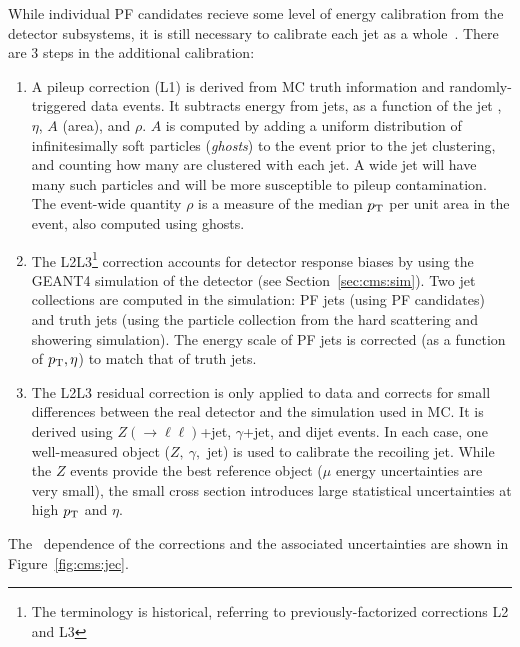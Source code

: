 While individual PF candidates recieve some level of energy calibration from the detector subsystems, it is still necessary to calibrate each jet as a whole~\cite{jec}.
There are 3 steps in the additional calibration:
\begin{enumerate}
\item A pileup correction (L1) is derived from MC truth information and randomly-triggered data events.
It subtracts energy from jets, as a function of the jet \pt, $\eta$, $A$ (area), and $\rho$. 
$A$ is computed by adding a uniform distribution of infinitesimally soft particles (\emph{ghosts}) to the event prior to the jet clustering, and counting how many are clustered with each jet. 
A wide jet will have many such particles and will be more susceptible to pileup contamination.
The event-wide quantity $\rho$ is a measure of the median $p_\mathrm{T}$ per unit area in the event, also computed using ghosts.

\item The L2L3\footnote{The terminology is historical, referring to previously-factorized corrections L2 and L3} correction accounts for detector response biases by using the GEANT4 simulation of the detector (see Section~\ref{sec:cms:sim}).
Two jet collections are computed in the simulation: PF jets (using PF candidates) and truth jets (using the particle collection from the hard scattering and showering simulation). 
The energy scale of PF jets is corrected (as a function of $p_\mathrm{T},\eta$) to match that of truth jets.

\item The L2L3 residual correction is only applied to data and corrects for small differences between the real detector and the simulation used in MC.
It is derived using $Z(\rightarrow\ell\ell)$+jet, $\gamma$+jet, and dijet events.
In each case, one well-measured object ($Z,~\gamma,$ jet) is used to calibrate the recoiling jet.
While the $Z$ events provide the best reference object ($\mu$ energy uncertainties are very small), the small cross section introduces large statistical uncertainties at high $p_\mathrm{T}$ and $\eta$. 
\end{enumerate}
The \pt~dependence of the corrections and the associated uncertainties are shown in Figure~\ref{fig:cms:jec}.

